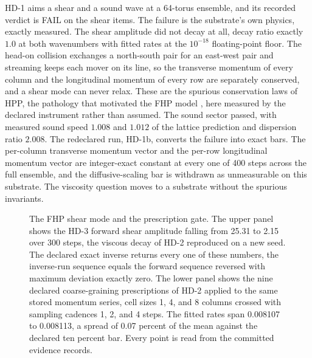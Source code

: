 \documentclass[aps,pre,reprint,nofootinbib,floatfix]{revtex4-2}
\begin{document}
HD-1 aims a shear and a sound wave at a 64-torus ensemble, and its
recorded verdict is FAIL on the shear items.  The failure is the
substrate's own physics, exactly measured.  The shear amplitude did
not decay at all, decay ratio exactly $1.0$ at both wavenumbers
with fitted rates at the $10^{-18}$ floating-point floor.  The
head-on collision exchanges a north-south pair for an east-west
pair and streaming keeps each mover on its line, so the transverse
momentum of every column and the longitudinal momentum of every row
are separately conserved, and a shear mode can never relax.  These
are the spurious conservation laws of HPP, the pathology that
motivated the FHP model \cite{FHP1986}, here measured by the
declared instrument rather than assumed.  The sound sector passed,
with measured sound speed $1.008$ and $1.012$ of the lattice
prediction and dispersion ratio $2.008$.  The redeclared run,
HD-1b, converts the failure into exact bars.  The per-column
transverse momentum vector and the per-row longitudinal momentum
vector are integer-exact constant at every one of 400 steps across
the full ensemble, and the diffusive-scaling bar is withdrawn as
unmeasurable on this substrate.  The viscosity question moves to a
substrate without the spurious invariants.

\begin{figure}[t]
\centering
{}
\caption{The FHP shear mode and the prescription gate.  The upper
panel shows the HD-3 forward shear amplitude falling from 25.31 to
2.15 over 300 steps, the viscous decay of HD-2 reproduced on a new
seed.  The declared exact inverse returns every one of these
numbers, the inverse-run sequence equals the forward sequence
reversed with maximum deviation exactly zero.  The lower panel
shows the nine declared coarse-graining prescriptions of HD-2
applied to the same stored momentum series, cell sizes 1, 4, and 8
columns crossed with sampling cadences 1, 2, and 4 steps.  The
fitted rates span 0.008107 to 0.008113, a spread of 0.07 percent of
the mean against the declared ten percent bar.  Every point is read
from the committed evidence records.}
\label{fig:hd}
\end{figure}
\end{document}

